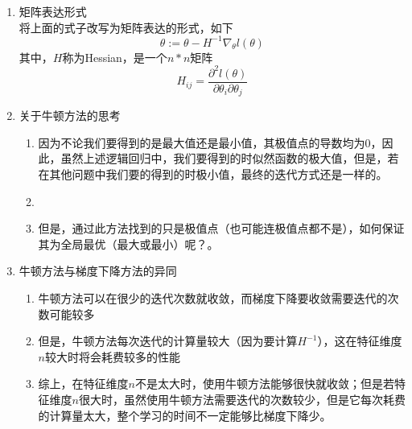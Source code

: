 \begin{enumerate}
	\item 矩阵表达形式 \\
	将上面的式子改写为矩阵表达的形式，如下
	\begin{equation}
		\theta := \theta - H^{-1}\nabla_{\theta}l(\theta)
	\end{equation}
	其中，$H$称为Hessian，是一个$n*n$矩阵
	\begin{equation}
		H_{ij} = \frac{\partial^2l(\theta)}{\partial\theta_i\partial\theta_j}
	\end{equation}

	\item 关于牛顿方法的思考
	\begin{enumerate}
		\item 因为不论我们要得到的是最大值还是最小值，其极值点的导数均为$0$，因此，虽然上述逻辑回归中，我们要得到的时似然函数的极大值，但是，若在其他问题中我们要的得到的时极小值，最终的迭代方式还是一样的。
		\item \item 但是，通过此方法找到的只是极值点（也可能连极值点都不是），如何保证其为全局最优（最大或最小）呢？。{\color{red}{此项待研究。。}}
	\end{enumerate}

	\item 牛顿方法与梯度下降方法的异同
	\begin{enumerate}
		\item 牛顿方法可以在很少的迭代次数就收敛，而梯度下降要收敛需要迭代的次数可能较多
		\item 但是，牛顿方法每次迭代的计算量较大（因为要计算$H^{-1}$），这在特征维度$n$较大时将会耗费较多的性能
		\item 综上，在特征维度$n$不是太大时，使用牛顿方法能够很快就收敛；但是若特征维度$n$很大时，虽然使用牛顿方法需要迭代的次数较少，但是它每次耗费的计算量太大，整个学习的时间不一定能够比梯度下降少。
	\end{enumerate}
\end{enumerate}














